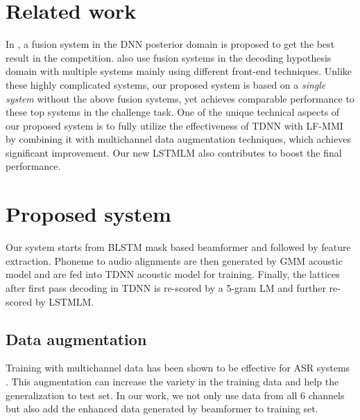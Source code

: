 \documentclass[a4paper]{article}
\begin{document}
\section{Related work}
In \cite{du2016ustc}, a fusion system in the DNN posterior domain is proposed to get the best result in the competition. 
\cite{menne2016rwth,erdogan2016multi,fujita2016unsupervised} also use fusion systems in the decoding hypothesis domain with multiple systems mainly using different front-end techniques.
Unlike these highly complicated systems, our proposed system is based on a {\it single system} without the above fusion systems, yet achieves comparable performance to these top systems in the challenge task.
One of the unique technical aspects of our proposed system is to fully utilize the effectiveness of TDNN with LF-MMI by combining it with multichannel data augmentation techniques, which achieves significant improvement.
Our new LSTMLM also contributes to boost the final performance.
\label{sec:advance}

\section{Proposed system}
\noindent Our system starts from BLSTM mask based beamformer and followed by feature extraction. Phoneme to audio alignments are then generated by GMM acoustic model and are fed into TDNN acoustic model for training. Finally, the lattices after first pass decoding in TDNN is re-scored by a 5-gram LM and further re-scored by LSTMLM.

\subsection{Data augmentation}
\label{sec:6data}
Training with multichannel data has been shown to be effective for ASR systems \cite{erdogan2016multi,barker2015third,hori2017multi}. 
This augmentation can increase the variety in the training data and help the generalization to test set. 
In our work, we not only use data from all 6 channels but also add the enhanced data generated by beamformer to training set.
\end{document}
